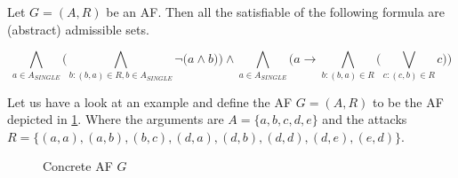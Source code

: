 \begin{definition}
    Let $G=(A,R)$ be an AF. Then all the satisfiable of the following formula are (abstract) admissible sets.
    \begin{center}
        \[ \bigwedge_{a \in A_{\!S\!I\!N\!G\!L\!E}} \big( \bigwedge_{b:(b,a)\in R, b \in A_{\!S\!I\!N\!G\!L\!E}} \lnot \big( a \wedge b \big)\big) \land  \bigwedge_{a \in A_{\!S\!I\!N\!G\!L\!E}} \big( a \rightarrow \bigwedge_{b:(b,a) \in R} \big( \bigvee_{c:(c,b) \in R} c\big) \big)
        \]
    \end{center}
    \label{def:booleanFormulaAdmissible}
\end{definition}


\begin{example}
    Let us have a look at an example and define the AF $G=(A,R)$ to be the AF depicted in \cref{af:algorithmEncodingsAdmissible}. Where the arguments are $A=\{a, b, c, d, e\}$ and the attacks $R=\big\{ (a,a), (a,b), (b,c), (d,a), (d,b), (d,d), (d, e), (e, d)\big\}$.

    \begin{figure}[H]
        \centering
        \caption{Concrete AF $G$}
        \label{af:algorithmEncodingsAdmissible}
    \end{figure}


\end{example}
